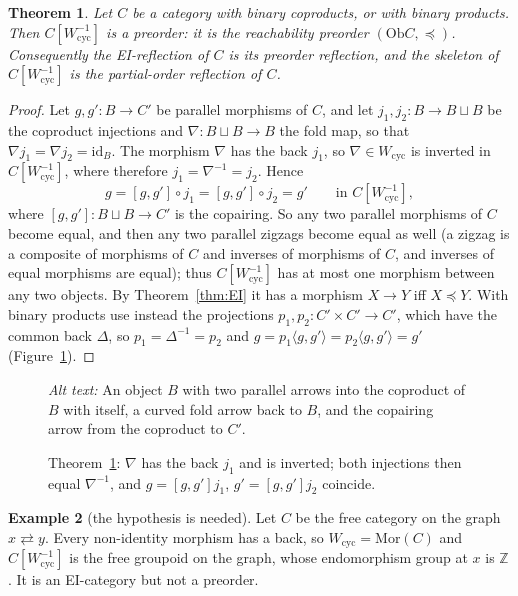 \documentclass[11pt]{amsart}
\newtheorem{thm}{Theorem}[section]
\theoremstyle{definition}
\newtheorem{ex}[thm]{Example}
\newcommand{\Mor}{\mathrm{Mor}}
\newcommand{\Ob}{\mathrm{Ob}}
\newcommand{\Wcyc}{W_{\mathrm{cyc}}}
\begin{document}
\begin{thm}\label{thm:main}
Let $C$ be a category with binary coproducts, or with binary products.
Then $C[\Wcyc^{-1}]$ is a preorder: it is the reachability preorder
$(\Ob C,\preceq)$. Consequently the EI-reflection of $C$ is its preorder
reflection, and the skeleton of $C[\Wcyc^{-1}]$ is the partial-order
reflection of $C$.
\end{thm}
\begin{proof}
Let $g,g'\colon B\to C'$ be parallel morphisms of $C$, and let
$j_1,j_2\colon B\to B\sqcup B$ be the coproduct injections and
$\nabla\colon B\sqcup B\to B$ the fold map, so that
$\nabla j_1=\nabla j_2=\mathrm{id}_B$. The morphism $\nabla$ has the back $j_1$, so
$\nabla\in\Wcyc$ is inverted in $C[\Wcyc^{-1}]$, where therefore
$j_1=\nabla^{-1}=j_2$. Hence
\[
g=[g,g']\circ j_1=[g,g']\circ j_2=g'\qquad\text{in }C[\Wcyc^{-1}],
\]
where $[g,g']\colon B\sqcup B\to C'$ is the copairing. So any two parallel
morphisms of $C$ become equal, and then any two parallel zigzags become
equal as well (a zigzag is a composite of morphisms of $C$ and inverses of
morphisms of $C$, and inverses of equal morphisms are equal); thus
$C[\Wcyc^{-1}]$ has at most one morphism between any two objects. By
Theorem~\ref{thm:EI} it has a morphism $X\to Y$ iff $X\preceq Y$. With
binary products use instead the projections $p_1,p_2\colon C'\times C'\to C'$,
which have the common back $\Delta$, so $p_1=\Delta^{-1}=p_2$ and
$g=p_1\langle g,g'\rangle=p_2\langle g,g'\rangle=g'$
(Figure~\ref{fig:main}).
\end{proof}

\begin{figure}[ht]
\centering
{}
\caption{Theorem~\ref{thm:main}: $\nabla$ has the back $j_1$ and is inverted;
both injections then equal $\nabla^{-1}$, and $g=[g,g']j_1$, $g'=[g,g']j_2$
coincide.}
\label{fig:main}
\par\smallskip\noindent\textit{Alt text:} An object $B$ with two parallel
arrows into the coproduct of $B$ with itself, a curved fold arrow back to
$B$, and the copairing arrow from the coproduct to $C'$.
\end{figure}

\begin{ex}[the hypothesis is needed]
Let $C$ be the free category on the graph $x\rightleftarrows y$. Every
non-identity morphism has a back, so $\Wcyc=\Mor(C)$ and $C[\Wcyc^{-1}]$ is the
free groupoid on the graph, whose endomorphism group at $x$ is $\mathbb Z$.
It is an EI-category but not a preorder.
\end{ex}
\end{document}
